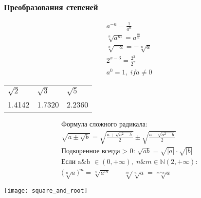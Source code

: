 \documentclass[10pt,a4paper]{scrartcl}
\begin{document}
	\subsubsection*{Преобразования степеней}
	\begin{minipage}{0.25\linewidth}\noindent 
		\begin{align*}
		& a^{-n} = \frac {1}{a^n} \\
		& \sqrt[n]{a^m} = a ^ {\frac {m}{n}} \\
		& \sqrt[n]{-a} = -\sqrt[n]{a} \\
		& 2^{x-3} = \frac {2^3}{2^x} \\
		& a^0 = 1,\; if a \neq 0
		\end{align*}
		\begin{tabular}{lll}
		$\sqrt{2}$ & $\sqrt{3}$ & $\sqrt{5}$ \\
		1.4142                    & 1.7320                    & 2.2360                   
		\end{tabular}
	\end{minipage}
	\hfill
	\begin{minipage}{0.40\linewidth}\noindent 
		\begin{align*}
		& \text{Формула сложного радикала:} \\
		& \sqrt{a\pm \sqrt{b}} = 
			    \sqrt{\frac{
			            a + \sqrt{a^2-b}
			                }
			                {2}
			        } \pm 
			        \sqrt{\frac{
			            a - \sqrt{a^2-b}
			                }
			                {2}
			        }\\[6pt]
		& \text{Подкоренное всегда > 0: }\sqrt{ab} = \sqrt{| a |} \cdot \sqrt{|b|} \\[6pt]
		& \text{Если a\&b }  \in (0, +\infty), \; n\&m \in \mathbb {N}(2, +\infty) \text{:} \\
		& \big( \sqrt[n]{a}\big)^m = \sqrt[n]{a^m} \qquad \sqrt[m]{\sqrt[n]{a}} = \sqrt[m * n]{a}
		\end{align*}
	\end{minipage}
	\hfill
	\begin{minipage}{0.25\linewidth}\noindent
		\texttt{[image: square\_and\_root]}
	\end{minipage}
	
\end{document}
